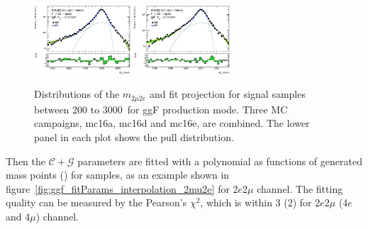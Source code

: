\begin{figure}[htbp]
    \includegraphics[width=0.32\textwidth]{figures/HMHZZ/signal/NWA//ggf_mass_signal_1800_H4l_2mu2e.eps}
    \includegraphics[width=0.32\textwidth]{figures/HMHZZ/signal/NWA//ggf_mass_signal_2000_H4l_2mu2e.eps}
    \caption{Distributions of the $m_{2\mu 2e}$ and fit projection for signal samples between 200 to 3000~\gev for ggF production mode. 
    Three MC campaigns, mc16a, mc16d and mc16e, are combined. 
    The lower panel in each plot shows the pull distribution.}
    \label{fig:ggf_mass_signalParam_2mu2e}
\end{figure}

Then the $\mathcal{C}+\mathcal{G}$ parameters are fitted with a polynomial as functions of generated mass points (\mH) for samples, as an example shown in figure~\ref{fig:ggf_fitParams_interpolation_2mu2e} for 2$e$2$\mu$ channel.
The fitting quality can be measured by the Pearson’s $\chi^2$, which is within 3 (2) for 2$e$2$\mu$ (4$e$ and 4$\mu$) channel.

